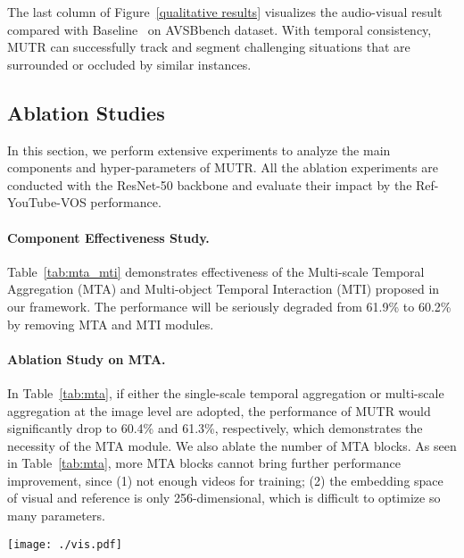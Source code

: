 \documentclass{article}
\begin{document}
The last column of Figure~\ref{qualitative results} visualizes the audio-visual result compared with Baseline~\cite{zhou2022audio} on AVSBbench dataset. With temporal consistency, MUTR can successfully track and segment challenging situations that are surrounded or occluded by similar instances.

\subsection{Ablation Studies}\label{s4.5}
In this section, we perform extensive experiments to analyze the main components and hyper-parameters of MUTR. All the ablation experiments are conducted with the ResNet-50 backbone and evaluate their impact by the Ref-YouTube-VOS performance.


\paragraph{Component Effectiveness Study.} Table~\ref{tab:mta_mti} demonstrates effectiveness of the Multi-scale Temporal Aggregation (MTA) and Multi-object Temporal Interaction (MTI) proposed in our framework.  The performance will be seriously degraded from  61.9\% to 60.2\% by removing MTA and MTI modules.

\paragraph{Ablation Study on MTA.}
In Table~\ref{tab:mta}, if either the single-scale temporal aggregation or multi-scale aggregation at the image level are adopted, the performance of MUTR would significantly drop to 60.4\% and 61.3\%, respectively, which demonstrates the necessity of the MTA module. We also ablate the number of MTA blocks. As seen in Table~\ref{tab:mta}, more MTA blocks cannot bring further performance improvement, since (1) not enough videos for training; (2) the embedding space of visual and reference is only 256-dimensional, which is difficult to optimize so many parameters.

\begin{figure*}[t!]
  \centering
    \texttt{[image: ./vis.pdf]}
   \caption{\textbf{Qualitative Results of MUTR.} We visualize the results between ReferFormer~\cite{wu2022language} and MUTR on R-VOS benchmarks and between Baseline~\cite{zhou2022audio} and MUTR on AV-VOS benchmark. Compared with ReferFormer, MUTR performs better on temporal consistency when segmenting multiple similar objects, i.e., fire truck in Ref-YouTube-VOS and box in Ref-DAVIS 2017. Also, compared with the baseline of AV-VOS~\cite{zhou2022audio} that denoted as `Baseline' in this figure, MUTR can handle serve occlusion.}
    \label{qualitative results}
    \vspace{0.2cm}
\end{figure*}
\end{document}
